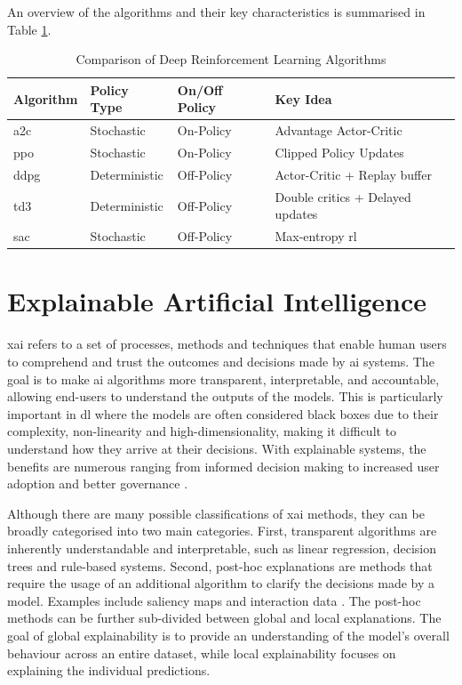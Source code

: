 An overview of the algorithms and their key characteristics is summarised in Table \ref{tab:drl_algorithms_comparison}. 

\begin{table}[h]
    \centering
    \begin{tabular}{|l|l|l|l|}
        \hline
        Algorithm & Policy Type & On/Off Policy & Key Idea \\
        \hline
        \acrshort{a2c} & Stochastic & On-Policy & Advantage Actor-Critic \\
        \acrshort{ppo} & Stochastic & On-Policy & Clipped Policy Updates \\
        \acrshort{ddpg} & Deterministic & Off-Policy & Actor-Critic + Replay buffer \\
        \acrshort{td3} & Deterministic & Off-Policy & Double critics + Delayed updates \\
        \acrshort{sac} & Stochastic & Off-Policy & Max-entropy \acrshort{rl} \\
        \hline
    \end{tabular}
    \caption{Comparison of Deep Reinforcement Learning Algorithms}
    \label{tab:drl_algorithms_comparison}
\end{table}

\section{Explainable Artificial Intelligence} \label{sec:explainableai}

\acrfull{xai} refers to a set of processes, methods and techniques that enable human users to comprehend and trust the outcomes and decisions made by \acrfull{ai} systems. The goal is to make \acrshort{ai} algorithms more transparent, interpretable, and accountable, allowing end-users to understand the outputs of the models. This is particularly important in \acrfull{dl} where the models are often considered black boxes  due to their complexity, non-linearity and high-dimensionality, making it difficult to understand how they arrive at their decisions. With explainable systems, the benefits are numerous ranging from informed decision making to increased user adoption and better governance \cite{Phillips2021}. 

Although there are many possible classifications of \acrshort{xai} methods, they can be broadly categorised into two main categories. First, transparent algorithms are inherently understandable and interpretable, such as linear regression, decision trees and rule-based systems. Second, post-hoc explanations are methods that require the usage of an additional algorithm to clarify the decisions made by a model. Examples include saliency maps \cite{Sequeira2020} and interaction data \cite{Greydanus2018}. The post-hoc methods can be further sub-divided between global and local explanations. The goal of global explainability is to provide an understanding of the model's overall behaviour across an entire dataset, while local explainability focuses on explaining the individual predictions.

